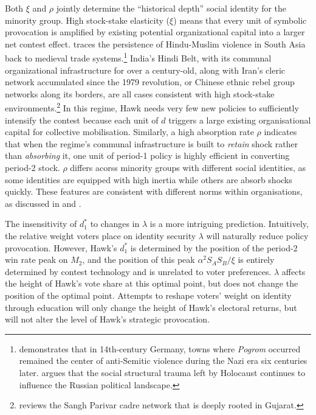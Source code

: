 \documentclass[11pt,twoside]{extarticle}
\begin{document}
Both $\xi$ and $\rho$ jointly determine the ``historical depth'' social identity for the minority group. High stock-stake elasticity ($\xi$) means that every unit of symbolic provocation is amplified by existing potential organizational capital into a larger net contest effect. \citet{jhaTradeInstitutionsEthnic2013} traces the persistence of Hindu-Muslim violence in South Asia back to medieval trade systems.\footnote{\citet*{voigtländerPersecutionPerpetuatedMedieval2012} demonstrates that in 14th-century Germany, towns where \emph{Pogrom} occurred remained the center of anti-Semitic violence during the Nazi era six centuries later. \citet*{acemogluSocialStructureDevelopment2011} argues that the social structural trauma left by Holocaust continues to influence the Russian political landscape.} India's Hindi Belt, with its communal organizational infrastructure for over a century-old, along with Iran's cleric network accumulated since the 1979 revolution, or Chinese ethnic rebel group networks along its borders, are all cases consistent with high stock-stake environments.\footnote{\citet*{andersonBrotherhoodSaffronRashtriya2019} reviews the Sangh Parivar cadre network that is deeply rooted in Gujarat.} 
In this regime, Hawk needs very few new policies to sufficiently intensify the contest because each unit of $d$ triggers a large existing organisational capital for collective mobilisation. Similarly, a high absorption rate $\rho$ indicates that when the regime's communal infrastructure is built to \emph{retain} shock rather than \emph{absorbing} it, one unit of period-1 policy is highly efficient in converting period-2 stock. $\rho$ differs acorss minority groups with different social identities, as some identities are equipped with high inertia while others are absorb shocks quickly. 
These features are consistent with different norms within organisations, as discussed in \citet*{youngEvolutionConventions1993} and \citet*{carvalhoModelingSocialInstitutions2025}.

The insensitivity of $d_1^*$ to changes in $\lambda$ is a more intriguing prediction. Intuitively, the relative weight voters place on identity security $\lambda$ will naturally reduce policy provocation. However, Hawk's $d_1^*$ is determined by the position of the period-2 win rate peak on $M_2$, and the position of this peak $\alpha^2 S_A S_B / \xi$ is entirely determined by contest technology and is unrelated to voter preferences. $\lambda$ affects the height of Hawk's vote share at this optimal point, but does not change the position of the optimal point. Attempts to reshape voters' weight on identity through education \citep*{shayoModelSocialIdentity2009,gennaioliIdentityPolitics2023} will only change the height of Hawk's electoral returns, but will not alter the level of Hawk's strategic provocation.
\end{document}
